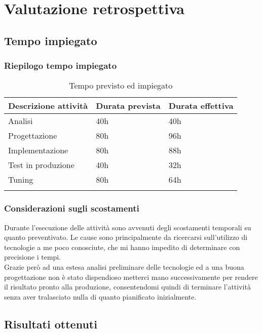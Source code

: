 \documentclass[Tesi.tex]{subfiles}
\begin{document}
\chapter{Valutazione retrospettiva}

\section{Tempo impiegato}

\subsection{Riepilogo tempo impiegato}
\label{table:Tempo previsto ed impiegato}
\renewcommand*{\arraystretch}{1.2}
\begin{longtable}[H]{p{6cm}p{3.5cm}p{3.5cm}}
	\rowcolor{CHeader}
	\color{CHeaderText} \textbf{Descrizione attivit\`{a}} & \color{CHeaderText} \textbf{Durata prevista} & \color{CHeaderText} \textbf{Durata effettiva} \\
	\endhead
		Analisi & 40h & 40h \\
		Progettazione & 80h & 96h \\
		Implementazione & 80h & 88h \\
		Test in produzione & 40h & 32h \\
		Tuning & 80h & 64h \\
	\hiderowcolors
	\caption{Tempo previsto ed impiegato}
\end{longtable}

\subsection{Considerazioni sugli scostamenti}
Durante l'esecuzione delle attività sono avvenuti degli scostamenti temporali su quanto preventivato. Le cause sono principalmente da ricercarsi sull'utilizzo di tecnologie a me poco conosciute, che mi hanno impedito di determinare con precisione i tempi. \\
Grazie però ad una estesa analisi preliminare delle tecnologie ed a una buona progettazione non è stato dispendioso metterci mano successivamente per rendere il risultato pronto alla produzione, consentendomi quindi di terminare l'attività senza aver tralasciato nulla di quanto pianificato inizialmente.

\section{Risultati ottenuti}
\end{document}

